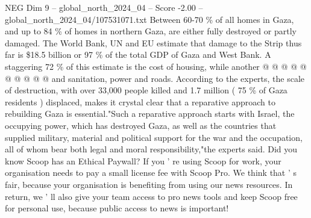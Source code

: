 \begin{textsample}{NEG Dim 9 – global\_north\_2024\_04 – Score -2.00 – global\_north\_2024\_04/107531071.txt}
Between 60-70 \% of all homes in Gaza, and up to 84 \% of homes in northern Gaza, are either fully destroyed or partly damaged.
The World Bank, UN and EU estimate that damage to the Strip thus far is \$18.5 billion or 97 \% of the total GDP of Gaza and West Bank.
A staggering 72 \% of this estimate is the cost of housing, while another @ @ @ @ @ @ @ @ @ @ and sanitation, power and roads.
According to the experts, the scale of destruction, with over 33,000 people killed and 1.7 million ( 75 \% of Gaza residents ) displaced, makes it crystal clear that a reparative approach to rebuilding Gaza is essential."Such a reparative approach starts with Israel, the occupying power, which has destroyed Gaza, as well as the countries that supplied military, material and political support for the war and the occupation, all of whom bear both legal and moral responsibility,"the experts said.
Did you know Scoop has an Ethical Paywall?
If you ' re using Scoop for work, your organisation needs to pay a small license fee with Scoop Pro.
We think that ' s fair, because your organisation is benefiting from using our news resources.
In return, we ' ll also give your team access to pro news tools and keep Scoop free for personal use, because public access to news is important!

\end{textsample}
